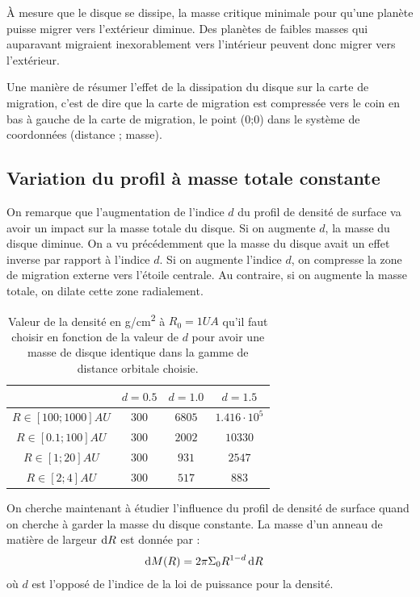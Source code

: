 À mesure que le disque se dissipe, la masse critique minimale pour qu'une planète puisse migrer vers l'extérieur diminue. Des planètes de faibles masses qui auparavant migraient inexorablement vers l'intérieur peuvent donc migrer vers l'extérieur. 

Une manière de résumer l'effet de la dissipation du disque sur la carte de migration, c'est de dire que la carte de migration
est compressée vers le coin en bas à gauche de la carte de migration, le point (0;0) dans le système de coordonnées (distance ;
masse).

\subsection{Variation du profil à masse totale constante}
On remarque que l'augmentation de l'indice $d$ du profil de densité de surface va avoir un impact sur la masse totale du
disque. Si on augmente $d$, la masse du disque diminue. On a vu précédemment que la masse du disque avait un effet inverse par rapport à l'indice $d$. Si on augmente
l'indice $d$, on compresse la zone de migration externe vers l'étoile centrale. Au contraire, si on augmente la masse totale, on
dilate cette zone radialement. 

\begin{table}[htbp]
\centering
\begin{tabular}{|c|c|c|c|}
\hline 
 & $d=0.5$ & $d=1.0$ & $d=1.5$ \\\hline 
$R\in[100 ; 1000]\unit{AU}$ & $300$ & $6805$ & $1.416\cdot 10^5$ \\ \hline 
$R\in[0.1 ; 100]\unit{AU}$ & $300$ & $2002$ & $10330$ \\ \hline 
$R\in[1 ; 20]\unit{AU}$ & $300$ & $931$ & $2547$ \\ \hline 
$R\in[2 ; 4]\unit{AU}$ & $300$ & $517$ & $883$ \\ \hline 
\end{tabular} 
\caption{Valeur de la densité en \unit{g/cm^2} à $R_0=1\unit{UA}$ qu'il faut choisir en fonction de la valeur de $d$ pour avoir une masse de disque identique dans la gamme de distance orbitale choisie.}\label{tab:profils_equivalents}
\end{table}

On cherche maintenant à étudier l'influence du profil de densité de surface quand on cherche à garder la masse du disque constante. La masse d'un anneau de matière de largeur $\operatorname{d \!} R$ est donnée par : 
\begin{align}
\operatorname{d \!} M(R) &= 2\pi \Sigma_0 R^{1-d} \operatorname{d \!} R
\end{align}
où $d$ est l'opposé de l'indice de la loi de puissance pour la densité. 

